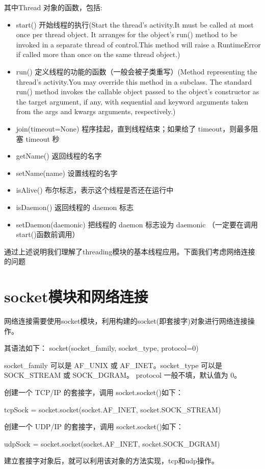 \documentclass[twoside,11pt]{book}
\begin{document}
其中Thread 对象的函数，包括:
\begin{itemize}
  \item start() 开始线程的执行(Start the thread’s activity.It must be called at most once per thread object. It arranges for the object’s run() method to be invoked in a separate thread of control.This method will raise a RuntimeError if called more than once on the same thread object.)
  \item run() 定义线程的功能的函数（一般会被子类重写）(Method representing the thread’s activity.You may override this method in a subclass. The standard run() method invokes the callable object passed to the object’s constructor as the target argument, if any, with sequential and keyword arguments taken from the args and kwargs arguments, respectively.)
  \item join(timeout=None) 程序挂起，直到线程结束；如果给了 timeout，则最多阻塞 timeout 秒
  \item getName() 返回线程的名字
  \item setName(name) 设置线程的名字
  \item isAlive() 布尔标志，表示这个线程是否还在运行中
  \item isDaemon() 返回线程的 daemon 标志
  \item setDaemon(daemonic) 把线程的 daemon 标志设为 daemonic （一定要在调用 start()函数前调用）
\end{itemize}

通过上述说明我们理解了threading模块的基本线程应用。下面我们考虑网络连接的问题

\section{socket模块和网络连接}
网络连接需要使用socket模块，利用构建的socket(即套接字)对象进行网络连接操作。

其语法如下：
socket(socket\_family, socket\_type, protocol=0)

socket\_family 可以是 AF\_UNIX 或 AF\_INET。socket\_type 可以是 SOCK\_STREAM 或 SOCK\_DGRAM。
protocol 一般不填，默认值为 0。

创建一个 TCP/IP 的套接字，调用 socket.socket()如下：

tcpSock = socket.socket(socket.AF\_INET, socket.SOCK\_STREAM)

创建一个 UDP/IP 的套接字，调用 socket.socket()如下：

udpSock = socket.socket(socket.AF\_INET, socket.SOCK\_DGRAM)

建立套接字对象后，就可以利用该对象的方法实现，tcp和udp操作。
\end{document}

